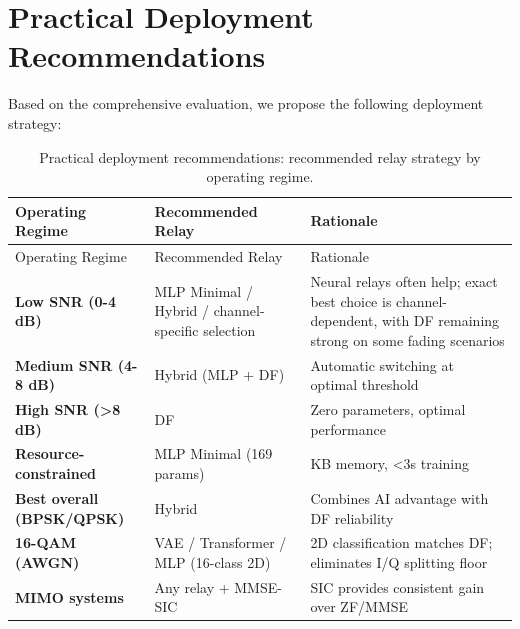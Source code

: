 \section{Practical Deployment Recommendations}\label{sec:practical-deployment-recommendations}

Based on the comprehensive evaluation, we propose the following deployment strategy:

\begin{longtable}[]{@{}
  >{\raggedright\arraybackslash}p{}
  >{\raggedright\arraybackslash}p{}
  >{\raggedright\arraybackslash}p{}@{}}
\caption{Practical deployment recommendations: recommended relay strategy by operating regime.}\label{tbl:table32}\tabularnewline
\toprule\noalign{}
\begin{minipage}[b]{\linewidth}\raggedright
Operating Regime
\end{minipage} & \begin{minipage}[b]{\linewidth}\raggedright
Recommended Relay
\end{minipage} & \begin{minipage}[b]{\linewidth}\raggedright
Rationale
\end{minipage} \\
\midrule\noalign{}
\endfirsthead
\toprule\noalign{}
\begin{minipage}[b]{\linewidth}\raggedright
Operating Regime
\end{minipage} & \begin{minipage}[b]{\linewidth}\raggedright
Recommended Relay
\end{minipage} & \begin{minipage}[b]{\linewidth}\raggedright
Rationale
\end{minipage} \\
\midrule\noalign{}
\endhead
\bottomrule\noalign{}
\endlastfoot
\textbf{Low SNR (0-4 dB)} & MLP Minimal / Hybrid / channel-specific selection & Neural relays often help; exact best choice is channel-dependent, with DF remaining strong on some fading scenarios \\
\textbf{Medium SNR (4-8 dB)} & Hybrid (MLP + DF) & Automatic switching at optimal threshold \\
\textbf{High SNR (\textgreater8 dB)} & DF & Zero parameters, optimal performance \\
\textbf{Resource-constrained} & MLP Minimal (169 params) & 0.7 KB memory, \textless3s training \\
\textbf{Best overall (BPSK/QPSK)} & Hybrid & Combines AI advantage with DF reliability \\
\textbf{16-QAM (AWGN)} & VAE / Transformer / MLP (16-class 2D) & 2D classification matches DF; eliminates I/Q splitting floor \\
\textbf{MIMO systems} & Any relay + MMSE-SIC & SIC provides consistent gain over ZF/MMSE \\
\end{longtable}

